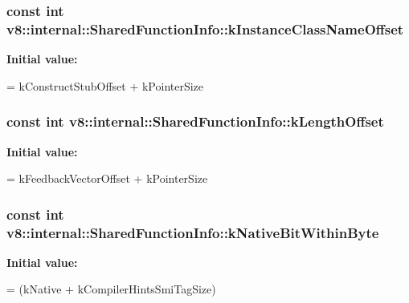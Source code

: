 \subsubsection[{k\+Instance\+Class\+Name\+Offset}]{\setlength{\rightskip}{0pt plus 5cm}const int v8\+::internal\+::\+Shared\+Function\+Info\+::k\+Instance\+Class\+Name\+Offset\hspace{0.3cm}{\ttfamily [static]}}\label{classv8_1_1internal_1_1_shared_function_info_a8157b1da28ec80de7d2881c7b888c9fe}
{\bfseries Initial value\+:}
\begin{DoxyCode}
=
      kConstructStubOffset + kPointerSize
\end{DoxyCode}
\hypertarget{classv8_1_1internal_1_1_shared_function_info_a05b8fac91ffaf48253bf9b5c81023da8}{}
\subsubsection[{k\+Length\+Offset}]{\setlength{\rightskip}{0pt plus 5cm}const int v8\+::internal\+::\+Shared\+Function\+Info\+::k\+Length\+Offset\hspace{0.3cm}{\ttfamily [static]}}\label{classv8_1_1internal_1_1_shared_function_info_a05b8fac91ffaf48253bf9b5c81023da8}
{\bfseries Initial value\+:}
\begin{DoxyCode}
=
      kFeedbackVectorOffset + kPointerSize
\end{DoxyCode}
\hypertarget{classv8_1_1internal_1_1_shared_function_info_a8839dd80057205c96bfaa74767ed4c3a}{}
\subsubsection[{k\+Native\+Bit\+Within\+Byte}]{\setlength{\rightskip}{0pt plus 5cm}const int v8\+::internal\+::\+Shared\+Function\+Info\+::k\+Native\+Bit\+Within\+Byte\hspace{0.3cm}{\ttfamily [static]}}\label{classv8_1_1internal_1_1_shared_function_info_a8839dd80057205c96bfaa74767ed4c3a}
{\bfseries Initial value\+:}
\begin{DoxyCode}
=
      (kNative + kCompilerHintsSmiTagSize) %
\end{DoxyCode}
\hypertarget{classv8_1_1internal_1_1_shared_function_info_af8aa2665606eb1ba158d2d55d9df9032}{}

